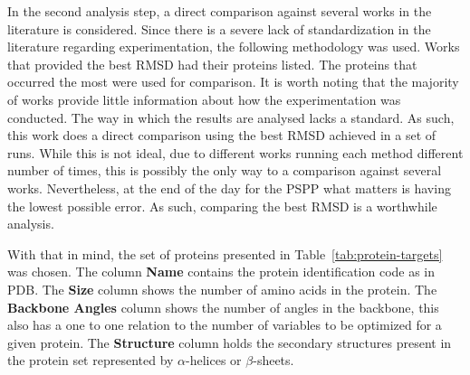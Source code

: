 In the second analysis step, a direct comparison against several works in the
literature is considered. Since there is a severe lack of standardization in the
literature regarding experimentation, the following methodology was used. Works
that provided the best RMSD had their proteins listed. The proteins that occurred
the most were used for comparison. It is worth noting that the majority of works
provide little information about how the experimentation was conducted. The way
in which the results are analysed lacks a standard. As such, this work does a
direct comparison using the best RMSD achieved in a set of runs. While this is
not ideal, due to different works running each method different number of times,
this is possibly the only way to a comparison against several works. %
Nevertheless, at the end of the day for the PSPP what matters is having the lowest possible error. As such, comparing the best RMSD is a worthwhile analysis. %

With that in mind, the set of proteins presented in Table~\ref{tab:protein-targets}
was chosen. The column \textbf{Name} contains the protein identification code
as in PDB.  The \textbf{Size} column shows the number of amino acids in the protein.
The \textbf{Backbone Angles} column shows the number of angles in the backbone,
this also has a one to one relation to the number of variables to be optimized
for a given protein. The \textbf{Structure} column holds the secondary
structures present in the protein set represented by $\alpha$-helices or
$\beta$-sheets.

